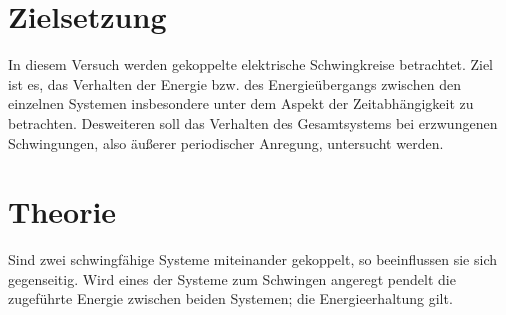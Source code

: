 \section{Zielsetzung}
In diesem Versuch werden gekoppelte elektrische Schwingkreise betrachtet. 
Ziel ist es, das Verhalten der Energie bzw. des Energieübergangs zwischen den einzelnen Systemen insbesondere unter dem Aspekt der Zeitabhängigkeit zu betrachten. 
Desweiteren soll das Verhalten des Gesamtsystems bei erzwungenen Schwingungen, also äußerer periodischer Anregung, untersucht werden.
\section{Theorie}
\label{sec:Theorie}
Sind zwei schwingfähige Systeme miteinander gekoppelt, so beeinflussen sie sich gegenseitig.
Wird eines der Systeme zum Schwingen angeregt pendelt die zugeführte Energie zwischen beiden Systemen; die Energieerhaltung gilt.
